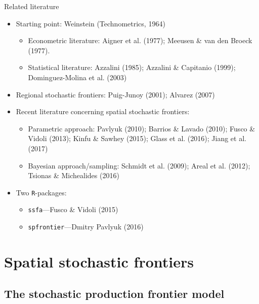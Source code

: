\documentclass[presentation]{beamer}
\begin{document}
\begin{frame}{Related literature}
\begin{itemize}
	\item Starting point: Weinstein (Technometrics, 1964)
	\begin{itemize}
		\item Econometric literature: Aigner et al. (1977); Meeusen \& van den Broeck (1977).
		\item Statistical literature: Azzalini (1985); Azzalini \& Capitanio (1999); Dominguez-Molina et al. (2003)
	\end{itemize}
	\pause
	\item Regional stochastic frontiers: Puig-Junoy (2001); Alvarez (2007)
	\pause
	\item Recent literature concerning spatial stochastic frontiers:
	\begin{itemize}
		\item Parametric approach: Pavlyuk (2010); Barrios \& Lavado (2010); Fusco \& Vidoli (2013); Kinfu \& Sawhey (2015); Glass et al. (2016); Jiang et al. (2017)
		\item Bayesian approach/sampling: Schmidt et al. (2009); Areal et al. (2012); Tsionas \& Michealides (2016)
	\end{itemize}
	\pause
	\item Two \texttt{R}-packages:
	\begin{itemize}
		\item \texttt{ssfa}---Fusco \& Vidoli (2015)
		\item \texttt{spfrontier}---Dmitry Pavlyuk (2016)
	\end{itemize}
\end{itemize}
\end{frame}

\section{Spatial stochastic frontiers}

\subsection{The stochastic production frontier model}
\end{document}
